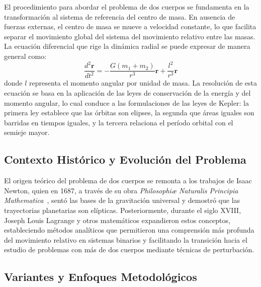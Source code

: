 El procedimiento para abordar el problema de dos cuerpos se fundamenta en la transformación al sistema de referencia del centro de masa. En ausencia de fuerzas externas, el centro de masa se mueve a velocidad constante, lo que facilita separar el movimiento global del sistema del movimiento relativo entre las masas. La ecuación diferencial que rige la dinámica radial se puede expresar de manera general como:
\begin{equation}
\frac{d^2 \mathbf{r}}{dt^2} = -\frac{G (m_1 + m_2)}{r^3} \mathbf{r} + \frac{l^2}{r^3} \mathbf{r}
\end{equation}
donde \(l\) representa el momento angular por unidad de masa. La resolución de esta ecuación se basa en la aplicación de las leyes de conservación de la energía y del momento angular, lo cual conduce a las formulaciones de las leyes de Kepler: la primera ley establece que las órbitas son elipses, la segunda que áreas iguales son barridas en tiempos iguales, y la tercera relaciona el período orbital con el semieje mayor. %

\subsection{Contexto Histórico y Evolución del Problema}

El origen teórico del problema de dos cuerpos se remonta a los trabajos de Isaac Newton, quien en 1687, a través de su obra \textit{Philosophiæ Naturalis Principia Mathematica}~\cite{newton1687}, sentó las bases de la gravitación universal y demostró que las trayectorias planetarias son elípticas. Posteriormente, durante el siglo XVIII, Joseph Louis Lagrange y otros matemáticos expandieron estos conceptos, estableciendo métodos analíticos que permitieron una comprensión más profunda del movimiento relativo en sistemas binarios y facilitando la transición hacia el estudio de problemas con más de dos cuerpos mediante técnicas de perturbación. %

\subsection{Variantes y Enfoques Metodológicos}

